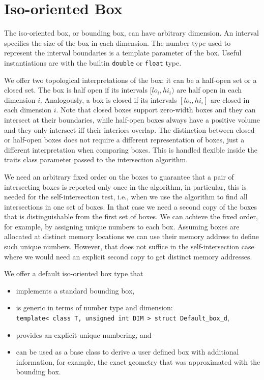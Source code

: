 {%
\section{Iso-oriented Box}

The iso-oriented box, or bounding box, can have arbitrary dimension.
An interval specifies the size of the box in each dimension. The
number type used to represent the interval boundaries is a template
parameter of the box. Useful instantiations are with the builtin
\texttt{double} or \texttt{float} type.

We offer two topological interpretations of the box; it can be a
half-open set or a closed set. The box is half open if its intervals
$[lo_i,hi_i)$ are half open in each dimension $i$. Analogously, a box
is closed if its intervals $[lo_i,hi_i]$ are closed in each dimension
$i$. Note that closed boxes support zero-width boxes and they can
intersect at their boundaries, while half-open boxes always have a
positive volume and they only intersect iff their interiors overlap.
The distinction between closed or half-open boxes does not require a
different representation of boxes, just a different interpretation
when comparing boxes. This is handled flexible inside the traits class
parameter passed to the intersection algorithm.

We need an arbitrary fixed order on the boxes to guarantee that a pair
of intersecting boxes is reported only once in the algorithm, in
particular, this is needed for the self-intersection test, i.e., when
we use the algorithm to find all intersections in one set of boxes. In
that case we need a second copy of the boxes that is distinguishable
from the first set of boxes. We can achieve the fixed order, for
example, by assigning unique numbers to each box. Assuming boxes are
allocated at distinct memory locations we can use their memory address
to define such unique numbers. However, that does not suffice in the
self-intersection case where we would need an explicit second copy to
get distinct memory addresses.

We offer a default iso-oriented box type that
\begin{itemize}
  \item implements a standard bounding box,
  \item is generic in terms of number type and dimension: \\
  \texttt{template< class T, unsigned int DIM > struct Default\_box\_d},
  \item provides an explicit unique numbering, and
  \item can be used as a base class to derive a user defined box with
  additional information, for example, the exact geometry
  that was approximated with the bounding box.
\end{itemize}

}

